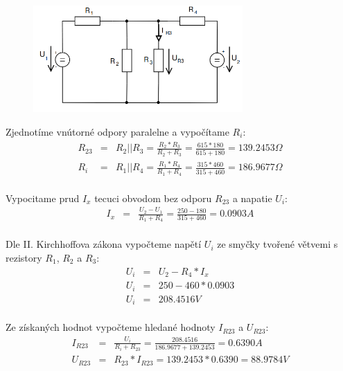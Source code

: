 \documentclass[a4paper,oneside,12pt]{article}
\begin{document}
	\begin{figure}[h]
		\begin{center}
			\includegraphics[width=8cm,keepaspectratio]{img/pr2.png}
		\end{center}
	\end{figure}

	Zjednotíme vnútorné odpory paralelne a vypočítame $R_{i}$:
	\begin{eqnarray*}
		R_{23} &= & R_{2} || R_{3} = \frac{R_{2} * R_{3}}{R_{2} + R_{3}} = \frac{615 * 180}{615 + 180} = 139.2453 \Omega\\
		R_{i} &= & R_{1} || R_{4} = \frac{R_{1} * R_{4}}{R_{1} + R_{4}} = \frac{315 * 460}{315 + 460} = 186.9677 \Omega\\
	\end{eqnarray*}

	Vypocitame prud $I_{x}$ tecuci obvodom bez odporu $R_{23}$ a napatie $U_{i}$:
	\begin{eqnarray*}
		I_{x} &= & \frac{U_{2} - U_{1}}{R_{1} + R_{4}} = \frac{250 - 180}{315 + 460} = 0.0903 A\\
	\end{eqnarray*}

	Dle II. Kirchhoffova zákona vypočteme napětí $U_{i}$ ze smyčky tvořené větvemi s rezistory $R_{1}$, $R_{2}$ a $R_{3}$:
	\begin{eqnarray*}
		U_{i} &= & U_{2} - R_{4} * I_{x} \\
		U_{i} &= & 250 - 460 * 0.0903 \\
		U_{i} &= & 208.4516V \\
	\end{eqnarray*}

	Ze získaných hodnot vypočteme hledané hodnoty $I_{R23}$ a $U_{R23}$:
	\begin{eqnarray*}
		I_{R23} &= & \frac{U_{i}}{R_{i} + R_{23}} = \frac{208.4516}{186.9677 + 139.2453} = 0.6390 A\\
		U_{R23} &= & R_{23} * I_{R23} = 139.2453 * 0.6390 = 88.9784 V\\
	\end{eqnarray*}
\end{document}
